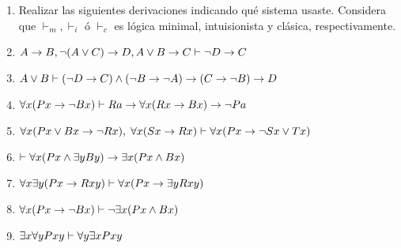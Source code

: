 \documentclass[letterpaper, 11 pt]{article}
\begin{document}
\begin{enumerate}
\item Realizar las siguientes derivaciones indicando qué sistema usaste. Considera que $\vdash_m,\vdash_i$ ó $\vdash_c$ es lógica minimal, intuisionista y clásica, respectivamente.
  \bi
\item $A\rightarrow B, \neg(A\lor C)\rightarrow D, A\lor B\rightarrow C\vdash \neg D\rightarrow C$
\item $A\lor B\vdash (\neg D\rightarrow C)\land (\neg B\rightarrow\neg A)\rightarrow
  (C\rightarrow\neg B)\rightarrow D$
      \item $\forall x(Px\rightarrow\neg Bx)\vdash Ra\rightarrow\forall x(Rx\rightarrow Bx)\rightarrow\neg
        Pa$
        \item $\forall x (Px\lor Bx\rightarrow\neg Rx),\;\forall x(Sx\rightarrow Rx)\vdash
          \forall x(Px\rightarrow \neg Sx\lor Tx)$
          \item $\vdash\forall x(Px\land \exists yBy)\rightarrow \exists x(Px\land Bx)$
            \item $\forall x\exists y(Px\rightarrow Rxy)\vdash \forall x(Px\rightarrow \exists y
              Rxy)$
              \item $\forall x(Px\rightarrow\neg Bx)\vdash \neg\exists x(Px\land Bx)$
                \item $\exists x\forall yPxy\vdash \forall y\exists x Pxy$
  \ei

\end{enumerate}







\end{document}
